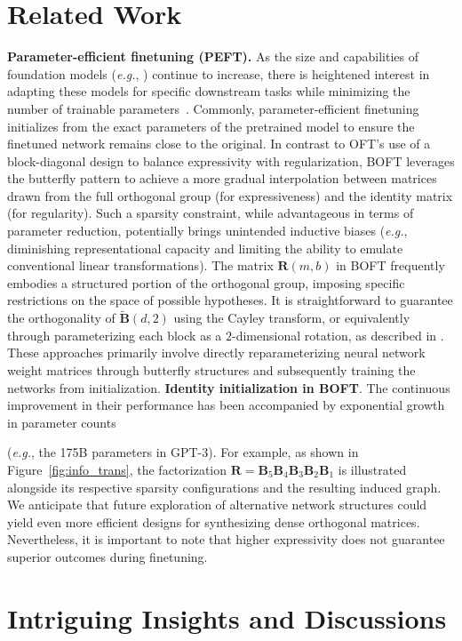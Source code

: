 \section{Related Work}

\textbf{Parameter-efficient finetuning (PEFT).} As the size and capabilities of foundation models (\emph{e.g.}, \cite{brown2020language,radford2021learning,rombach2022high,kirillov2023segment}) continue to increase, there is heightened interest in adapting these models for specific downstream tasks while minimizing the number of trainable parameters~\cite{treviso2023efficient,ding2023parameter,lialin2023scaling}. Commonly, parameter-efficient finetuning initializes from the exact parameters of the pretrained model to ensure the finetuned network remains close to the original. In contrast to OFT’s use of a block-diagonal design to balance expressivity with regularization, BOFT leverages the butterfly pattern to achieve a more gradual interpolation between matrices drawn from the full orthogonal group (for expressiveness) and the identity matrix (for regularity). Such a sparsity constraint, while advantageous in terms of parameter reduction, potentially brings unintended inductive biases (\emph{e.g.}, diminishing representational capacity and limiting the ability to emulate conventional linear transformations). The matrix $\bm{R}(m,b)$ in BOFT frequently embodies a structured portion of the orthogonal group, imposing specific restrictions on the space of possible hypotheses. It is straightforward to guarantee the orthogonality of $\tilde{\bm{B}}(d,2)$ using the Cayley transform, or equivalently through parameterizing each block as a $2$-dimensional rotation, as described in \cite{liu2021orthogonal,qiu2023controlling}. These approaches primarily involve directly reparameterizing neural network weight matrices through butterfly structures and subsequently training the networks from initialization. \textbf{Identity initialization in BOFT}. The continuous improvement in their performance has been accompanied by exponential growth in parameter counts

(\emph{e.g.}, the 175B parameters in GPT-3). For example, as shown in Figure~\ref{fig:info_trans}, the factorization $\bm{R} = \bm{B}_5\bm{B}_4\bm{B}_3\bm{B}_2\bm{B}_1$ is illustrated alongside its respective sparsity configurations and the resulting induced graph. We anticipate that future exploration of alternative network structures could yield even more efficient designs for synthesizing dense orthogonal matrices. Nevertheless, it is important to note that higher expressivity does not guarantee superior outcomes during finetuning. \section{Intriguing Insights and Discussions}

